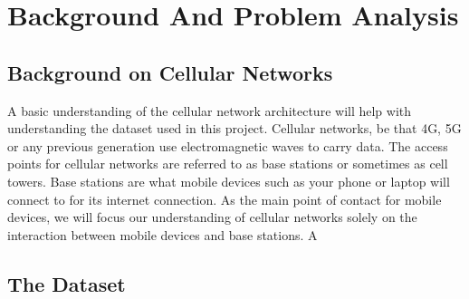 \chapter{Background And Problem Analysis}


\section{Background on Cellular Networks}
A basic understanding of the cellular network architecture will help with understanding the dataset used in this project. Cellular networks, be that 4G, 5G or any previous generation use electromagnetic waves to carry data. The access points for cellular networks are referred to as base stations or sometimes as cell towers. Base stations are what mobile devices such as your phone or laptop will connect to for its internet connection. As the main point of contact for mobile devices, we will focus our understanding of cellular networks solely on the interaction between mobile devices and base stations. A 


\section{The Dataset}
